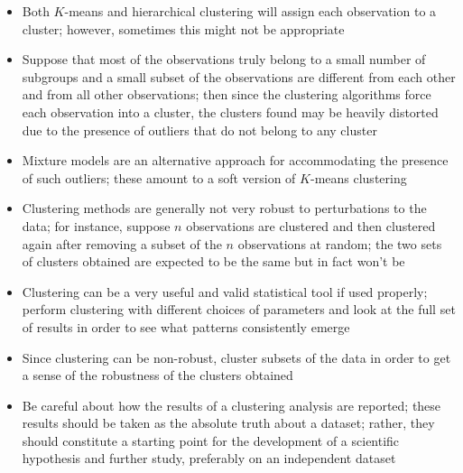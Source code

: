 \documentclass[12pt]{article}
\begin{document}
\begin{itemize}
\item Both $K$-means and hierarchical clustering will assign each observation to a cluster; however, sometimes this might not be appropriate
\item Suppose that most of the observations truly belong to a small number of subgroups and a small subset of the observations are different from each other and from all other observations; then since the clustering algorithms force each observation into a cluster, the clusters found may be heavily distorted due to the presence of outliers that do not belong to any cluster 
\item Mixture models are an alternative approach for accommodating the presence of such outliers; these amount to a soft version of $K$-means clustering
\item Clustering methods are generally not very robust to perturbations to the data; for instance, suppose $n$ observations are clustered and then clustered again after removing a subset of the $n$ observations at random; the two sets of clusters obtained are expected to be the same but in fact won't be 
\item Clustering can be a very useful and valid statistical tool if used properly; perform clustering with different choices of parameters and look at the full set of results in order to see what patterns consistently emerge
\item Since clustering can be non-robust, cluster subsets of the data in order to get a sense of the robustness of the clusters obtained
\item Be careful about how the results of a clustering analysis are reported; these results should be taken as the absolute truth about a dataset; rather, they should constitute a starting point for the development of a scientific hypothesis and further study, preferably on an independent dataset
\end{itemize}
\end{document}
